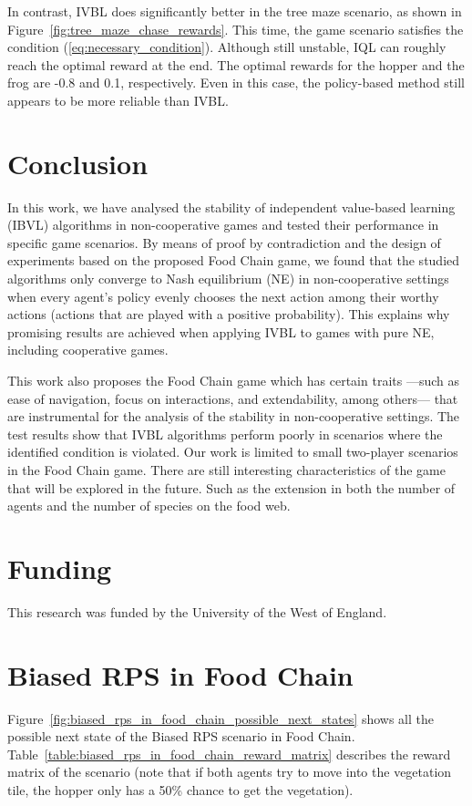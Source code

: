 \documentclass[]{interact}
\theoremstyle{plain}%
\theoremstyle{definition}
\theoremstyle{remark}
\begin{document}
In contrast, IVBL does significantly better in the tree maze scenario, as shown in Figure~\ref{fig:tree_maze_chase_rewards}. This time, the game scenario satisfies the condition (\ref{eq:necessary_condition}). Although still unstable, IQL can roughly reach the optimal reward at the end. The optimal rewards for the hopper and the frog are -0.8 and 0.1, respectively. Even in this case, the policy-based method still appears to be more reliable than IVBL.

\section{Conclusion}
In this work, we have analysed the stability of independent value-based learning (IBVL) algorithms in non-cooperative games and tested their performance in specific game scenarios. By means of proof by contradiction and the design of experiments based on the proposed Food Chain game, we found that the studied algorithms only converge to Nash equilibrium (NE) in non-cooperative settings when every agent's policy evenly chooses the next action among their worthy actions (actions that are played with a positive probability). This explains why promising results are achieved when applying IVBL to games with pure NE, including cooperative games.

This work also proposes the Food Chain game which has certain traits ---such as ease of navigation, focus on interactions, and extendability, among others--- that are instrumental for the analysis of the stability in non-cooperative settings. The test results show that IVBL algorithms perform poorly in scenarios where the identified condition is violated. Our work is limited to small two-player scenarios in the Food Chain game. There are still interesting characteristics of the game that will be explored in the future. Such as the extension in both the number of agents and the number of species on the food web.

\section*{Funding}
This research was funded by the University of the West of England.




\pagebreak
\appendix

\section{Biased RPS in Food Chain}
Figure~\ref{fig:biased_rps_in_food_chain_possible_next_states} shows all the possible next state of the Biased RPS scenario in Food Chain. Table~\ref{table:biased_rps_in_food_chain_reward_matrix} describes the reward matrix of the scenario (note that if both agents try to move into the vegetation tile, the hopper only has a 50\% chance to get the vegetation).
\end{document}
